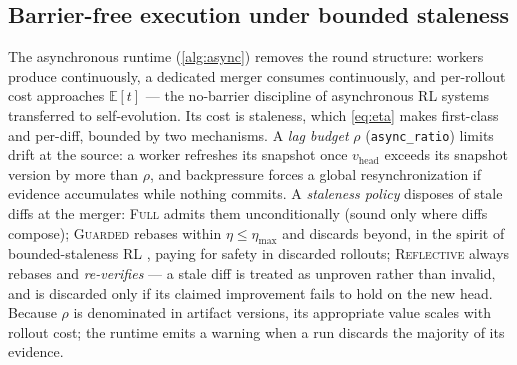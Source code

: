 \documentclass{article}
\newcommand{\code}[1]{\texttt{#1}}
\begin{document}
\subsection{Barrier-free execution under bounded staleness}
\label{sec:async}
The asynchronous runtime (\cref{alg:async}) removes the round structure: workers produce continuously, a dedicated merger consumes continuously, and per-rollout cost approaches $\mathbb{E}[t]$ --- the no-barrier discipline of asynchronous RL systems \citep{fu2025areal,roll2025flash} transferred to self-evolution. Its cost is staleness, which \cref{eq:eta} makes first-class and per-diff, bounded by two mechanisms. A \emph{lag budget} $\rho$ (\code{async\_ratio}) limits drift at the source: a worker refreshes its snapshot once $v_{\mathrm{head}}$ exceeds its snapshot version by more than $\rho$, and backpressure forces a global resynchronization if evidence accumulates while nothing commits. A \emph{staleness policy} disposes of stale diffs at the merger: \textsc{Full} admits them unconditionally (sound only where diffs compose); \textsc{Guarded} rebases within $\eta \le \eta_{\max}$ and discards beyond, in the spirit of bounded-staleness RL \citep{fu2025areal}, paying for safety in discarded rollouts; \textsc{Reflective} always rebases and \emph{re-verifies} --- a stale diff is treated as unproven rather than invalid, and is discarded only if its claimed improvement fails to hold on the new head. Because $\rho$ is denominated in artifact versions, its appropriate value scales with rollout cost; the runtime emits a warning when a run discards the majority of its evidence.
\end{document}
